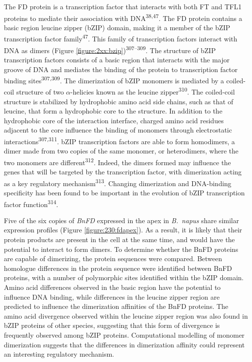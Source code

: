 \documentclass[12pt,]{book}
\begin{document}
The FD protein is a transcription factor that interacts with both FT and
TFL1 proteins to mediate their association with
DNA\textsuperscript{38,47}. The FD protein contains a basic region
leucine zipper (bZIP) domain, making it a member of the bZIP
transcription factor family\textsuperscript{47}. This family of
transcription factors interact with DNA as dimers (Figure
\ref{figure:2xx:bzip})\textsuperscript{307--309}. The structure of bZIP
transcription factors consists of a basic region that interacts with the
major groove of DNA and mediates the binding of the protein to
transcription factor binding sites\textsuperscript{307,309}. The
dimerization of bZIP monomers is mediated by a coiled-coil structure of
two \(\alpha\)-helicies known as the leucine
zipper\textsuperscript{310}. The coiled-coil structure is stabilized by
hydrophobic amino acid side chains, such as that of leucine, that form a
hydrophobic core to the structure. In addition to the hydrophobic core
of the interaction interface, charged amino acid residues adjacent to
the core influence the binding of monomers through electrostatic
interactions\textsuperscript{307,311}. bZIP transcription factors are
able to form homodimers, a dimer made from two copies of the same
monomer, or heterodimers, where the two monomers are
different\textsuperscript{312}. Indeed, the dimers formed may influence
the genes that will be targeted by the transcription factor, with
dimerization acting as a key regulatory mechanism\textsuperscript{313}.
Changing dimerization and DNA-binding specificity has been found to be
important in the evolution of bZIP transcription factor
function\textsuperscript{314}.

Five of the six copies of \emph{BnFD} expressed in the apex in
\emph{B.~napus} share similar expression profiles (Figure
\ref{figure:230:fdapex}). As a result, it is likely that their protein
products are present in the cell at the same time, and would have the
potential to interact to form dimers. To determine whether the BnFD
proteins are capable of dimerizing, the protein sequences were compared.
Between homologue differences in the protein sequence were identified
between BnFD proteins, with a number of polymorphic sites identified
within the bZIP domain. Amino acid differences observed in the basic
region have the potential to influence DNA binding, while differences in
the leucine zipper region are predicted to influence the dimerization
affinities of the BnFD proteins. The amino acid divergence observed
within the leucine zipper region was also found in bZIP proteins of
other species, suggesting that this form of divergence is frequently
observed among bZIP proteins. Computational modelling of monomer
dimerization suggests that the differences in dimerization affinity
could represent an interesting regulatory mechanism.
\end{document}
